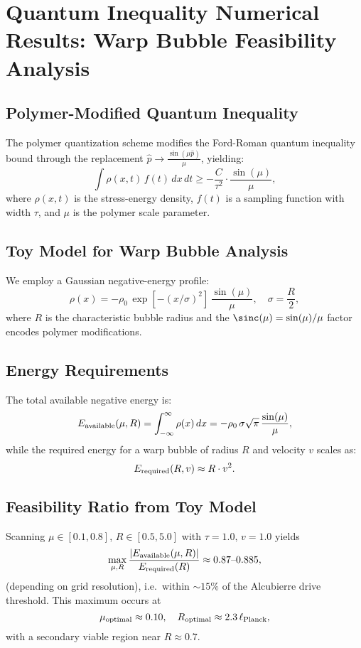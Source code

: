 \documentclass[11pt]{article}
\begin{document}
\section*{Quantum Inequality Numerical Results: Warp Bubble Feasibility Analysis}

\subsection*{Polymer-Modified Quantum Inequality}
The polymer quantization scheme modifies the Ford-Roman quantum inequality bound through the replacement $\hat{p} \rightarrow \frac{\sin(\mu\hat{p})}{\mu}$, yielding:
\[
  \int \rho(x,t)\,f(t)\,dx\,dt \geq -\frac{C}{\tau^2} \cdot \frac{\sin(\mu)}{\mu},
\]
where $\rho(x,t)$ is the stress-energy density, $f(t)$ is a sampling function with width $\tau$, and $\mu$ is the polymer scale parameter.

\subsection*{Toy Model for Warp Bubble Analysis}
We employ a Gaussian negative-energy profile:
\[
  \rho(x) = -\rho_0\,\exp\left[-(x/\sigma)^2\right]\,\frac{\sin(\mu)}{\mu},\quad \sigma=\frac{R}{2},
\]
where $R$ is the characteristic bubble radius and the $\sinc(\mu) = \sin(\mu)/\mu$ factor encodes polymer modifications.

\subsection*{Energy Requirements}
The total available negative energy is:
\[
  E_{\rm available}(\mu,R) = \int_{-\infty}^{\infty} \rho(x)\,dx = -\rho_0\,\sigma\sqrt{\pi}\,\frac{\sin(\mu)}{\mu},
\]
while the required energy for a warp bubble of radius $R$ and velocity $v$ scales as:
\[
  E_{\rm required}(R,v) \approx R \cdot v^2.
\]

\subsection*{Feasibility Ratio from Toy Model}
Scanning $\mu\in[0.1,0.8]$, $R\in[0.5,5.0]$ with $\tau=1.0,\,v=1.0$ yields
\[
  \max_{\mu,R}\frac{|E_{\rm available}(\mu,R)|}{E_{\rm required}(R)} 
  \approx 0.87\text{--}0.885,
\]
(depending on grid resolution), i.e.\ within $\sim15\%$ of the Alcubierre drive threshold.  
This maximum occurs at
\[
  \mu_{\rm optimal} \approx 0.10,\quad R_{\rm optimal} \approx 2.3\,\ell_{\rm Planck},
\]
with a secondary viable region near $R\approx0.7$.
\end{document}
